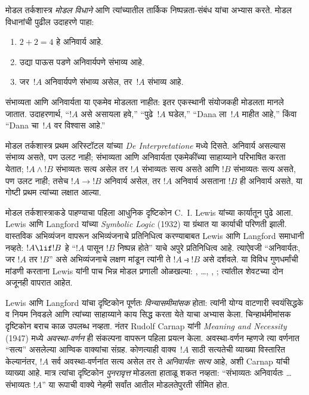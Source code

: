\documentclass[../../../include/open-logic-section]{subfiles}
\begin{document}


मोडल तर्कशास्त्र \emph{मोडल विधाने} आणि त्यांच्यातील तार्किक
निष्पन्नता-संबंध यांचा अभ्यास करते. मोडल विधानांची पुढील
उदाहरणे पाहा:
\begin{enumerate}
\item $2+2=4$ हे अनिवार्य आहे.
\item उद्या पाऊस पडणे अनिवार्यपणे संभाव्य आहे.
\item जर~$!A$ अनिवार्यपणे संभाव्य असेल, तर~$!A$ संभाव्य आहे.
\end{enumerate}
संभाव्यता आणि अनिवार्यता या एकमेव मोडलता नाहीत: इतर एकस्थानी
संयोजकही मोडलता मानले जातात. उदाहरणार्थ, ``$!A$ असे असायला हवे,''
``पुढे~$!A$ घडेल,'' ``Dana ला~$!A$ माहीत आहे,'' किंवा
``Dana चा~$!A$ वर विश्वास आहे.''

मोडल तर्कशास्त्र प्रथम अरिस्टॉटल यांच्या \emph{De
  Interpretatione} मध्ये दिसते. अनिवार्य असल्यास संभाव्य असते,
पण उलट नाही; संभाव्यता आणि अनिवार्यता एकमेकींच्या साहाय्याने
परिभाषित करता येतात; $!A \land !B$ संभाव्यतः सत्य असेल तर
$!A$ संभाव्यतः सत्य असते आणि $!B$ संभाव्यतः सत्य असते,
पण उलट नाही; तसेच $!A \to !B$ अनिवार्य असेल, तर $!A$
अनिवार्य असताना $!B$ ही अनिवार्य असते, या गोष्टी प्रथम
त्यांच्या लक्षात आल्या.

मोडल तर्कशास्त्राकडे पाहण्याचा पहिला आधुनिक दृष्टिकोन
C.~I. Lewis यांच्या कार्यातून पुढे आला. Lewis आणि Langford
यांच्या \emph{Symbolic Logic} (1932) या ग्रंथात या कार्याची
परिणती झाली. वास्तविक अभिव्यंजन वापरून अभिव्यंजनाचे प्रतिनिधित्व
करण्याबाबत Lewis आणि Langford समाधानी नव्हते: $!A \lif !B$
हे ``$!A$ पासून $!B$ निष्पन्न होते'' याचे अपुरे प्रतिनिधित्व आहे.
त्याऐवजी ``अनिवार्यतः, जर $!A$ तर $!B$'' असे अभिव्यंजनाचे
लक्षण मांडून त्यांनी ते $!A \strictif !B$ असे दर्शवले.
या विविध गुणधर्मांची मांडणी करताना Lewis यांनी पाच भिन्न
मोडल प्रणाली ओळखल्या: , \ldots, , ;
त्यांतील शेवटच्या दोन अजूनही वापरात आहेत.

Lewis आणि Langford यांचा दृष्टिकोन पूर्णतः \emph{विन्यासमीमांसक}
होता: त्यांनी योग्य वाटणारी स्वयंसिद्धके व नियम निवडले आणि
त्यांच्या साहाय्याने काय सिद्ध करता येते याचा अभ्यास केला.
चिन्हार्थमीमांसक दृष्टिकोन बराच काळ उपलब्ध नव्हता.
नंतर Rudolf Carnap यांनी \emph{Meaning and Necessity} (1947)
मध्ये \emph{अवस्था-वर्णन} ही संकल्पना वापरून पहिला प्रयत्न केला.
अवस्था-वर्णन म्हणजे त्या वर्णनात ``सत्य'' असलेल्या आण्विक
वाक्यांचा संग्रह. कोणत्याही वाक्य~$!A$ साठी सत्यतेची व्याख्या
विस्तारित केल्यानंतर, $!A$ सर्व अवस्था-वर्णनांत सत्य असेल
तर ते \emph{अनिवार्यतः सत्य} आहे, अशी Carnap यांची व्याख्या आहे.
मात्र त्यांचा दृष्टिकोन \emph{पुनरावृत्त} मोडलता हाताळू शकत
नव्हता: ``संभाव्यतः अनिवार्यतः \ldots संभाव्यतः $!A$''
या रूपाची वाक्ये नेहमी सर्वांत आतील मोडलतेपुरती सीमित होत.
\end{document}
